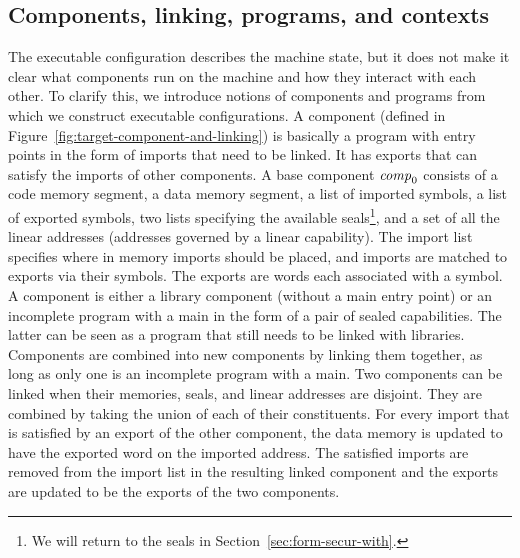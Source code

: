 \documentclass[acmsmall,screen]{acmart}\settopmatter{}
\renewcommand{\comp}{\var{comp}}
\begin{document}
\subsection{Components, linking, programs, and contexts }
\label{subsec:components-linking}
The executable configuration describes the machine state, but it does not make it clear what components run on the machine and how they interact with each other.
To clarify this, we introduce notions of components and programs from which we construct executable configurations.
A component (defined in Figure~\ref{fig:target-component-and-linking}) is basically a program with entry points in the form of imports that need to be linked.
It has exports that can satisfy the imports of other components.
A base component $\comp_0$ consists of a code memory segment, a data memory segment, a list of imported symbols, a list of exported symbols, two lists specifying the available seals\footnote{We will return to the seals in Section~\ref{sec:form-secur-with}.}, and a set of all the linear addresses (addresses governed by a linear capability).
The import list specifies where in memory imports should be placed, and imports are matched to exports via their symbols.
The exports are words each associated with a symbol.
A component is either a library component (without a main entry point) or an incomplete program with a main in the form of a pair of sealed capabilities.
The latter can be seen as a program that still needs to be linked with libraries.
Components are combined into new components by linking them together, as long as only one is an incomplete program with a main.
Two components can be linked when their memories, seals, and linear addresses are disjoint.
They are combined by taking the union of each of their constituents.
For every import that is satisfied by an export of the other component, the data memory is updated to have the exported word on the imported address.
The satisfied imports are removed from the import list in the resulting linked component and the exports are updated to be the exports of the two components.
\end{document}
